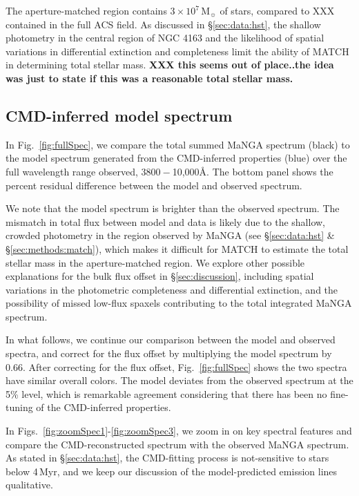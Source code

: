 \documentclass[preprint2]{aastex62}
\newcommand\Msun{\ensuremath{\,\mathrm{M_{\sun}}}\xspace}
\newcommand{\ang}{\ensuremath{\mbox{\AA}}\xspace}
\newcommand{\Myr}{$\,$Myr\xspace}
\begin{document}
The aperture-matched region contains $3\times10^7\Msun$ of stars, compared to XXX contained in the full ACS field. As discussed in \S\ref{sec:data:hst}, the shallow photometry in the central region of NGC 4163 and the likelihood of spatial variations in differential extinction and completeness limit the ability of MATCH in determining total stellar mass. \textbf{XXX this seems out of place..the idea was just to state if this was a reasonable total stellar mass.}

\subsection{CMD-inferred model spectrum}

In Fig.~\ref{fig:fullSpec}, we compare the total summed MaNGA spectrum (black) to the model spectrum generated from the CMD-inferred properties (blue) over the full wavelength range observed, $3800-$10,000\ang. The bottom panel shows the percent residual difference between the model and observed spectrum. 

We note that the model spectrum is brighter than the observed spectrum. The mismatch in total flux between model and data is likely due to the shallow, crowded photometry in the region observed by MaNGA (see \S\ref{sec:data:hst} \& \S\ref{sec:methods:match}), which makes it difficult for MATCH to estimate the total stellar mass in the aperture-matched region. We explore other possible explanations for the bulk flux offset in \S\ref{sec:discussion}, including spatial variations in the photometric completeness and differential extinction, and the possibility of missed low-flux spaxels contributing to the total integrated MaNGA spectrum.

In what follows, we continue our comparison between the model and observed spectra, and correct for the flux offset by multiplying the model spectrum by 0.66. After correcting for the flux offset, Fig.~\ref{fig:fullSpec} shows the two spectra have similar overall colors. The model deviates from the observed spectrum at the 5\% level, which is remarkable agreement considering that there has been no fine-tuning of the CMD-inferred properties.

In Figs.~\ref{fig:zoomSpec1}-\ref{fig:zoomSpec3}, we zoom in on key spectral features and compare the CMD-reconstructed spectrum with the observed MaNGA spectrum. As stated in \S\ref{sec:data:hst}, the CMD-fitting process is not-sensitive to stars below 4\Myr, and we keep our discussion of the model-predicted emission lines qualitative.
\end{document}
